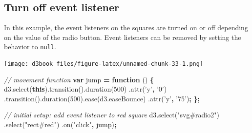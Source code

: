 \documentclass[openany]{book}
\newenvironment{Shaded}{\begin{snugshade}}{\end{snugshade}}
\newcommand{\AttributeTok}[1]{\textcolor[rgb]{0.77,0.63,0.00}{#1}}
\newcommand{\CommentTok}[1]{\textcolor[rgb]{0.56,0.35,0.01}{\textit{#1}}}
\newcommand{\DecValTok}[1]{\textcolor[rgb]{0.00,0.00,0.81}{#1}}
\newcommand{\KeywordTok}[1]{\textcolor[rgb]{0.13,0.29,0.53}{\textbf{#1}}}
\newcommand{\NormalTok}[1]{#1}
\newcommand{\OperatorTok}[1]{\textcolor[rgb]{0.81,0.36,0.00}{\textbf{#1}}}
\newcommand{\StringTok}[1]{\textcolor[rgb]{0.31,0.60,0.02}{#1}}
\newcommand{\VariableTok}[1]{\textcolor[rgb]{0.00,0.00,0.00}{#1}}
\begin{document}
\hypertarget{turn-off-event-listener}{%
\subsection{Turn off event listener}\label{turn-off-event-listener}}

In this example, the event listeners on the squares are turned on or off depending on the value of the radio button. Event listeners can be removed by setting the behavior to \texttt{null}.

\texttt{[image: d3book\_files/figure-latex/unnamed-chunk-33-1.png]}

\begin{Shaded}
\begin{Highlighting}[]
\CommentTok{// movement function}
\KeywordTok{var}\NormalTok{ jump }\OperatorTok{=} \KeywordTok{function}\NormalTok{ () }\OperatorTok{\{}
      \VariableTok{d3}\NormalTok{.}\AttributeTok{select}\NormalTok{(}\KeywordTok{this}\NormalTok{).}\AttributeTok{transition}\NormalTok{().}\AttributeTok{duration}\NormalTok{(}\DecValTok{500}\NormalTok{)}
\NormalTok{      .}\AttributeTok{attr}\NormalTok{(}\StringTok{'y'}\OperatorTok{,} \StringTok{'0'}\NormalTok{)}
\NormalTok{      .}\AttributeTok{transition}\NormalTok{().}\AttributeTok{duration}\NormalTok{(}\DecValTok{500}\NormalTok{).}\AttributeTok{ease}\NormalTok{(}\VariableTok{d3}\NormalTok{.}\AttributeTok{easeBounce}\NormalTok{)}
\NormalTok{      .}\AttributeTok{attr}\NormalTok{(}\StringTok{'y'}\OperatorTok{,} \StringTok{'75'}\NormalTok{)}\OperatorTok{;}
\OperatorTok{\};}

\CommentTok{// initial setup: add event listener to red square}
\VariableTok{d3}\NormalTok{.}\AttributeTok{select}\NormalTok{(}\StringTok{"svg#radio2"}\NormalTok{)}
\NormalTok{  .}\AttributeTok{select}\NormalTok{(}\StringTok{"rect#red"}\NormalTok{)}
\NormalTok{  .}\AttributeTok{on}\NormalTok{(}\StringTok{"click"}\OperatorTok{,}\NormalTok{ jump)}\OperatorTok{;}
    

\end{Highlighting}
\end{Shaded}
\end{document}
